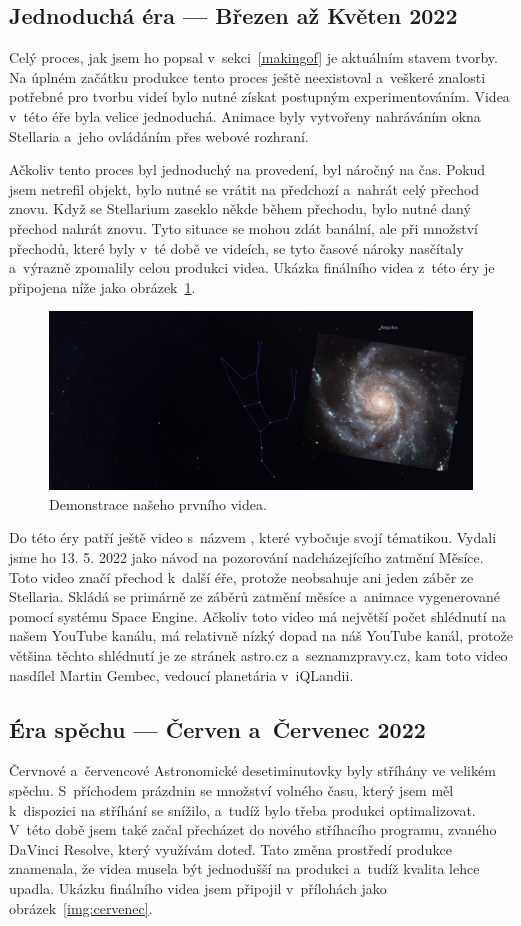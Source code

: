 \documentclass[12pt,a4paper,titlepage]{article}
\begin{document}
\subsection{Jednoduchá éra --- Březen až Květen 2022}
Celý proces, jak jsem ho popsal v~sekci~\ref{makingof} je aktuálním stavem tvorby. Na úplném začátku produkce tento proces ještě neexistoval a~veškeré znalosti potřebné pro tvorbu  videí bylo nutné získat postupným experimentováním. Videa v~této éře byla velice jednoduchá. Animace byly vytvořeny nahráváním okna Stellaria a~jeho ovládáním přes webové rozhraní.

Ačkoliv tento proces byl jednoduchý na provedení, byl náročný na čas. Pokud jsem netrefil objekt, bylo nutné se vrátit na předchozí a~nahrát celý přechod znovu. Když se Stellarium zaseklo někde během přechodu, bylo nutné daný přechod nahrát znovu. Tyto situace se mohou zdát banální, ale při množství přechodů, které byly v~té době ve videích, se tyto časové nároky nasčítaly a~výrazně zpomalily celou produkci videa. Ukázka finálního videa z~této éry je připojena níže jako obrázek~\ref{img:brezen}.

\begin{figure}[ht]
	\centering
	\includegraphics[width=.85\textwidth]{brezen.png}
	\caption{Demonstrace našeho prvního videa.}\label{img:brezen}
\end{figure}

Do této éry patří ještě video s~názvem , které vybočuje svojí tématikou. Vydali jsme ho 13. 5. 2022 jako návod na pozorování nadcházejícího zatmění Měsíce. Toto video značí přechod k~další éře, protože neobsahuje ani jeden záběr ze Stellaria. Skládá se primárně ze záběrů zatmění měsíce a~animace vygenerované pomocí systému Space Engine. Ačkoliv toto video má největší počet shlédnutí na našem YouTube kanálu, má relativně nízký dopad na náš YouTube kanál, protože většina těchto shlédnutí je ze stránek astro.cz a~seznamzpravy.cz, kam toto video nasdílel Martin Gembec, vedoucí planetária v~iQLandii.
\subsection{Éra spěchu --- Červen a~Červenec 2022}
Červnové a~červencové Astronomické desetiminutovky byly stříhány ve velikém spěchu. S~příchodem prázdnin se množství volného času, který jsem měl k~dispozici na stříhání se snížilo, a~tudíž bylo třeba produkci optimalizovat. V~této době jsem také začal přecházet do nového stříhacího programu, zvaného DaVinci Resolve, který využívám doteď. Tato změna prostředí produkce znamenala, že videa musela být jednodušší na produkci a~tudíž kvalita lehce upadla. Ukázku finálního videa jsem připojil v~přílohách jako obrázek~\ref{img:cervenec}.
\end{document}
